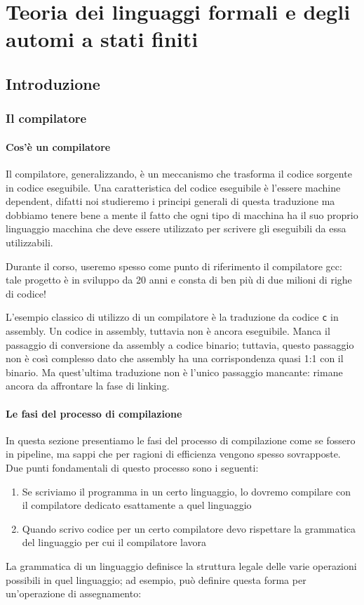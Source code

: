 \documentclass[class=book, crop=false, oneside, 12pt]{standalone}
\begin{document}
\part[Teoria dei linguaggi e degli automi]{Teoria dei linguaggi formali e degli automi a stati finiti}
\chapter{Introduzione}

\section{Il compilatore}
\subsection{Cos'è un compilatore}
Il compilatore, generalizzando, è un meccanismo che trasforma il codice sorgente in codice eseguibile.
Una caratteristica del codice eseguibile è l'essere machine dependent, difatti noi studieremo i principi generali di questa traduzione ma dobbiamo tenere bene a mente il fatto che ogni tipo di macchina ha il suo proprio linguaggio macchina che deve essere utilizzato per scrivere gli eseguibili da essa utilizzabili.


Durante il corso, useremo spesso come punto di riferimento il compilatore gcc: tale progetto è in sviluppo da 20 anni e consta di ben più di due milioni di righe di codice!


L’esempio classico di utilizzo di un compilatore è la traduzione da codice \texttt{c} in assembly.
Un codice in assembly, tuttavia non è ancora eseguibile. Manca il passaggio di conversione da assembly a codice binario; tuttavia, questo passaggio non è così complesso dato che assembly ha una corrispondenza quasi 1:1 con il binario.
Ma quest’ultima traduzione non è l’unico passaggio mancante: rimane ancora da affrontare la fase di linking.

\subsection{Le fasi del processo di compilazione}
In questa sezione presentiamo le fasi del processo di compilazione come se fossero in pipeline, ma sappi che per ragioni di efficienza vengono spesso sovrapposte. Due punti fondamentali di questo processo sono i seguenti:
\begin{enumerate}
    \item Se scriviamo il programma in un certo linguaggio, lo dovremo compilare con il compilatore dedicato esattamente a quel linguaggio
    \item Quando scrivo codice per un certo compilatore devo rispettare la grammatica del linguaggio per cui il compilatore lavora
\end{enumerate}
La grammatica di un linguaggio definisce la struttura legale delle varie operazioni possibili in quel linguaggio; ad esempio, può definire questa forma per un’operazione di assegnamento:
\end{document}
